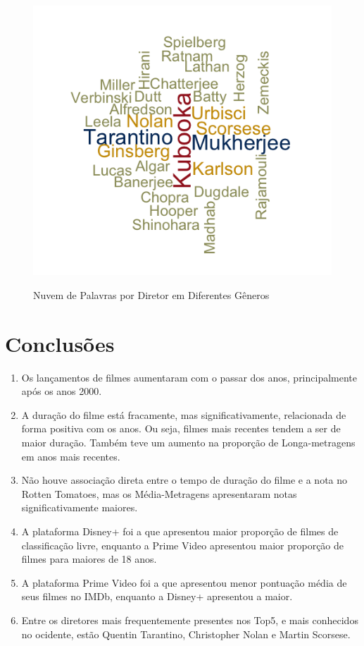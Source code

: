 \documentclass[a4paper, 12pt]{article} %
\begin{document}
\begin{figure}[H]
    \centering
    \caption{Nuvem de Palavras por Diretor em Diferentes Gêneros}
    \includegraphics[scale=1]{Nuvem.png}
    \label{fig:my_label}
\end{figure}


\pagebreak

\section{Conclusões}
\begin{enumerate}[topsep=0pt,partopsep=0pt]
    \item Os lançamentos de filmes aumentaram com o passar dos anos, principalmente após os anos 2000.
    \item A duração do filme está fracamente, mas significativamente, relacionada de forma positiva com os anos. Ou seja, filmes mais recentes tendem a ser de maior duração. Também teve um aumento na proporção de Longa-metragens em anos mais recentes. 
    \item Não houve associação direta entre o tempo de duração do filme e a nota no Rotten Tomatoes, mas os Média-Metragens apresentaram notas significativamente maiores. 
    \item A plataforma Disney+ foi a que apresentou maior proporção de filmes de classificação livre, enquanto a Prime Video apresentou maior proporção de filmes para maiores de 18 anos. 
    \item A plataforma Prime Video foi a que apresentou menor pontuação média de seus filmes no IMDb, enquanto a Disney+ apresentou a maior. 
    \item Entre os diretores mais frequentemente presentes nos Top5, e mais conhecidos no ocidente, estão Quentin Tarantino, Christopher Nolan e Martin Scorsese.
\end{enumerate}
\end{document}
